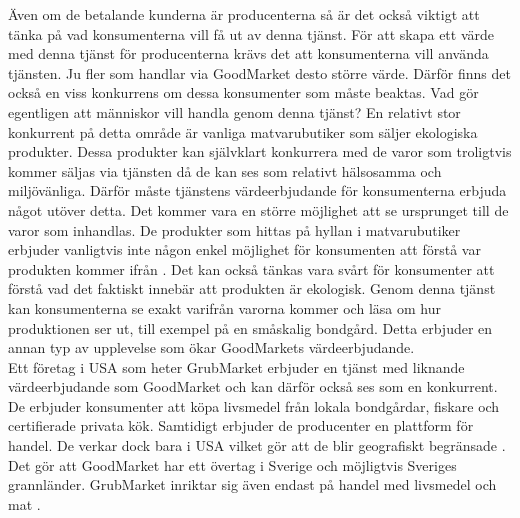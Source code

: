 \documentclass[10pt,a4paper,oneside]{article}
\begin{document}
Även om de betalande kunderna är producenterna så är det också viktigt att tänka på vad konsumenterna vill få ut av denna tjänst. För att skapa ett värde med denna tjänst för producenterna krävs det att konsumenterna vill använda tjänsten. Ju fler som handlar via GoodMarket desto större värde. Därför finns det också en viss konkurrens om dessa konsumenter som måste beaktas. Vad gör egentligen att människor vill handla genom denna tjänst? En relativt stor konkurrent på detta område är vanliga matvarubutiker som säljer ekologiska produkter. Dessa produkter kan självklart konkurrera med de varor som troligtvis kommer säljas via tjänsten då de kan ses som relativt hälsosamma och miljövänliga. Därför måste tjänstens värdeerbjudande för konsumenterna erbjuda något utöver detta. Det kommer vara en  större möjlighet att se ursprunget till de varor som inhandlas. De produkter som hittas på hyllan i matvarubutiker erbjuder vanligtvis inte någon enkel möjlighet för konsumenten att förstå var produkten kommer ifrån \cite{Naturskyddsföreningen3}. Det kan också tänkas vara svårt för konsumenter att förstå vad det faktiskt innebär att produkten är ekologisk. Genom denna tjänst kan konsumenterna se exakt varifrån varorna kommer och läsa om hur produktionen ser ut, till exempel på en småskalig bondgård. Detta erbjuder en annan typ av upplevelse som ökar GoodMarkets värdeerbjudande. \\

Ett företag i USA som heter GrubMarket erbjuder en tjänst med liknande värdeerbjudande som GoodMarket och kan därför också ses som en konkurrent. De erbjuder konsumenter att köpa livsmedel från lokala bondgårdar, fiskare och certifierade privata kök. Samtidigt erbjuder de producenter en plattform för handel. De verkar dock bara i USA vilket gör att de blir geografiskt begränsade \cite{Grubmarket1}. Det gör att GoodMarket har ett övertag i Sverige och möjligtvis Sveriges grannländer. GrubMarket inriktar sig även endast på handel med livsmedel och mat \cite{Grubmarket1}. \\
\end{document}

